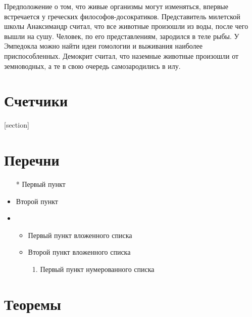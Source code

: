 Предположение о том, что живые организмы могут изменяться, впервые встречается у греческих философов-досократиков.
Представитель милетской школы Анаксимандр считал, что все животные произошли из воды, после чего вышли на сушу.
Человек, по его представлениям, зародился в теле рыбы.
У Эмпедокла можно найти идеи гомологии и выживания наиболее приспособленных.
Демокрит считал, что наземные животные произошли от земноводных, а те в свою очередь самозародились в илу.

\section{Счетчики}

[section]
\setcounter{customcounter}{2}
\addtocounter{customcounter}{1}

\renewcommand{\thesection}{\Asbuk{section}}
\renewcommand{\thesection}{\arabic{section}}

\section{Перечни}
\renewcommand{\theenumi}{\roman{enumi}}

\begin{itemize}
    \item[*] Первый пункт
    \item Второй пункт
    \item
          \begin{itemize}
              \item Первый пункт вложенного списка
              \item Второй пункт вложенного списка
                    \begin{enumerate}
                        \item Первый пункт нумерованного списка
                    \end{enumerate}
          \end{itemize}
\end{itemize}

\section{Теоремы}

